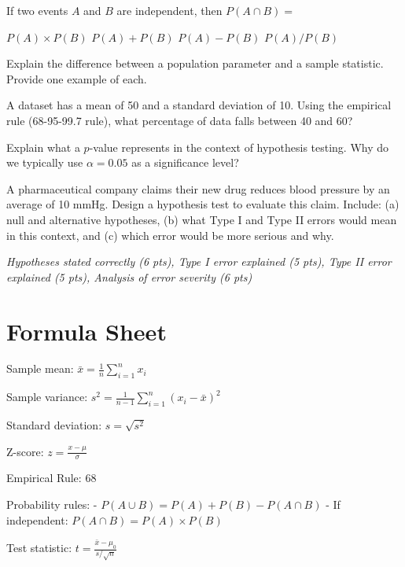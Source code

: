 \documentclass[11pt,letterpaper]{exam}
\begin{document}
\begin{questions}
\question[8] If two events $A$ and $B$ are independent, then $P(A \cap B) = $

\begin{choices}
  \choice $P(A) \times P(B)$
  \choice $P(A) + P(B)$
  \choice $P(A) - P(B)$
  \choice $P(A) / P(B)$
\end{choices}


\question[12] Explain the difference between a population parameter and a sample statistic. Provide one example of each.

\vspace{3in}


\question[12] A dataset has a mean of 50 and a standard deviation of 10. Using the empirical rule (68-95-99.7 rule), what percentage of data falls between 40 and 60?

\vspace{3in}


\question[15] Explain what a $p$-value represents in the context of hypothesis testing. Why do we typically use $\alpha = 0.05$ as a significance level?

\vspace{3in}


\question[22] A pharmaceutical company claims their new drug reduces blood pressure by an average of 10 mmHg. Design a hypothesis test to evaluate this claim. Include: (a) null and alternative hypotheses, (b) what Type I and Type II errors would mean in this context, and (c) which error would be more serious and why.

\textit{Hypotheses stated correctly (6 pts), Type I error explained (5 pts), Type II error explained (5 pts), Analysis of error severity (6 pts)}

\vspace{5in}


\newpage

\section*{Formula Sheet}

Sample mean: $\bar{x} = \frac{1}{n}\sum_{i=1}^{n} x_i$

Sample variance: $s^2 = \frac{1}{n-1}\sum_{i=1}^{n}(x_i - \bar{x})^2$

Standard deviation: $s = \sqrt{s^2}$

Z-score: $z = \frac{x - \mu}{\sigma}$

Empirical Rule: 68%

Probability rules:
- $P(A \cup B) = P(A) + P(B) - P(A \cap B)$
- If independent: $P(A \cap B) = P(A) \times P(B)$

Test statistic: $t = \frac{\bar{x} - \mu_0}{s/\sqrt{n}}$

\end{questions}
\end{document}
